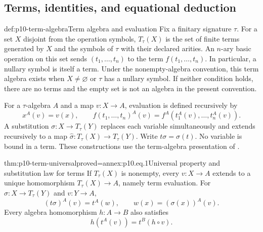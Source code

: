 
\subsection{Terms, identities, and equational deduction}
\label{sec:p10-equational-logic}

\begin{hbdefinition}{def:p10-term-algebra}{Term algebra and evaluation}
Fix a finitary signature \(\tau\). For a set \(X\) disjoint from the
operation symbols, \(T_\tau(X)\) is the set of finite terms generated
by \(X\) and the symbols of \(\tau\) with their declared arities.
An \(n\)-ary basic operation on this set sends
\((t_1,\ldots,t_n)\) to the term \(f(t_1,\ldots,t_n)\).
In particular, a nullary symbol is itself a term.
Under the nonempty-algebra convention, this term algebra exists when
\(X\ne\varnothing\) or \(\tau\) has a nullary symbol.
If neither condition holds, there are no terms and the empty set is
not an algebra in the present convention.

For a \(\tau\)-algebra \(A\) and a map \(v:X\to A\), evaluation is
defined recursively by
\[
 x^A(v)=v(x),\qquad
 f(t_1,\ldots,t_n)^A(v)
       =f^A(t_1^A(v),\ldots,t_n^A(v)).
\]
A substitution \(\sigma:X\to T_\tau(Y)\) replaces each variable
simultaneously and extends recursively to a map
\(\widehat\sigma:T_\tau(X)\to T_\tau(Y)\).
Write \(t\sigma=\widehat\sigma(t)\).
No variable is bound in a term.
These constructions use the term-algebra presentation of
\cite[II\S10, Definitions~10.1--10.4]{BurrisSankappanavar2012}.
\end{hbdefinition}

\begin{hbtheorem}{thm:p10-term-universal}{proved=annex:p10.eq.1}{Universal property and substitution law for terms}
If \(T_\tau(X)\) is nonempty, every \(v:X\to A\) extends to a unique
homomorphism \(T_\tau(X)\to A\), namely term evaluation.
For \(\sigma:X\to T_\tau(Y)\) and \(v:Y\to A\),
\[
 (t\sigma)^A(v)=t^A(w),
 \qquad w(x)=(\sigma(x))^A(v).
\]
Every algebra homomorphism \(h:A\to B\) also satisfies
\[
 h(t^A(v))=t^B(h\circ v).
\]
\end{hbtheorem}

